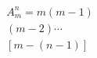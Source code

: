 \documentclass{book}
\begin{document}
\setcounter{chapter}{2}

\begin{multline}
A^{n}_{m}=m(m-1)\\(m-2)\cdots\\ [m-(n-1)]
\end{multline}
\end{document}

